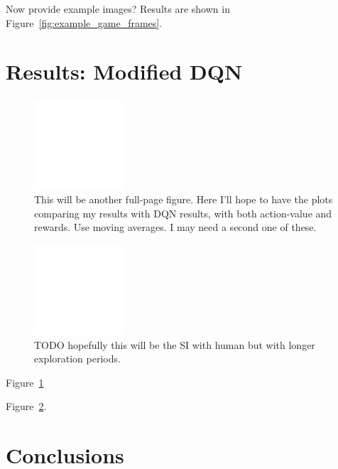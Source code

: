 \documentclass[letterpaper, 10pt, conference]{ieeeconf}
\begin{document}
Now provide example images? Results are shown in
Figure~\ref{fig:example_game_frames}.




\section{Results: Modified DQN}\label{sec:results_p2}

\begin{figure}[t]
\centering
\includegraphics[width=0.30\textwidth]{figures/empty.png}
\caption{\footnotesize
This will be another full-page figure. Here I'll hope to have the plots
comparing my results with DQN results, with both action-value and rewards. Use
moving averages. I may need a second one of these.
}
\label{fig:human_dqn_performance}
\end{figure}

\begin{figure}[t]
\centering
\includegraphics[width=0.30\textwidth]{figures/empty.png}
\caption{\footnotesize
TODO hopefully this will be the SI with human but with longer exploration
periods.
}
\label{fig:sp_inv_longer_exploration}
\end{figure}

Figure~\ref{fig:human_dqn_performance}

Figure~\ref{fig:sp_inv_longer_exploration}.



\section{Conclusions}\label{sec:conclusions}
\end{document}
